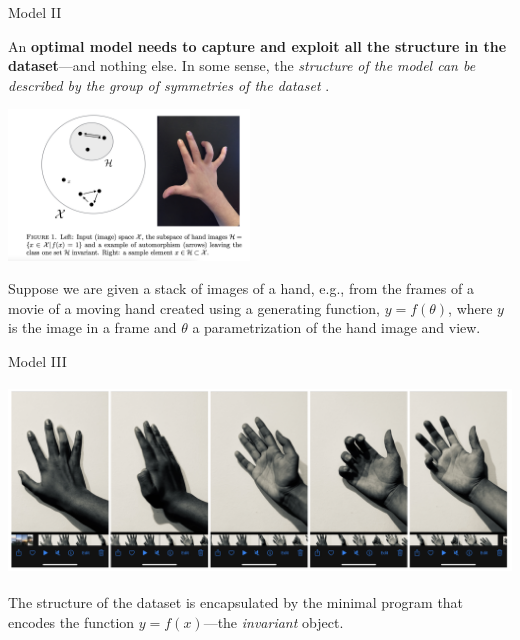 \begin{frame}[label=ladila]{Model II}

An {\bf optimal model needs to capture and exploit all the structure in the dataset}---and nothing else. In some sense, the {\em structure of the model can be described by the group of symmetries of the dataset}  \citep{Ruffini:2016ad}. 
 \begin{center}%
  \includegraphics[height=4cm]{img/hand2.png}
  \end{center}
  
Suppose we are given a stack of images of a hand, e.g., from the frames of a movie of a moving hand  created using a generating function,
$y = f(\theta)$, where $y$ is the image in a frame and $\theta$ a parametrization of the hand image and view.
\end{frame}

\begin{frame}[label=ladila]{Model III}
 \begin{center}%
  \includegraphics[height=5cm]{img/hands.png}
  \end{center}
  The structure of the dataset is encapsulated by the minimal program that encodes the function $y=f(x)$---the {\em invariant} object.  %
\end{frame}



